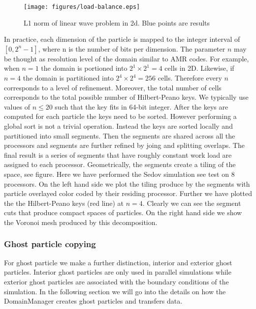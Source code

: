 \begin{figure}
    \begin{center}
        \texttt{[image: figures/load-balance.eps]}
        \caption{L1 norm of linear wave problem in 2d. Blue points are results}
    \end{center}
\end{figure}

In practice, each dimension of the particle is mapped to the integer interval
of $[0, 2^n-1]$, where n is the number of bits per dimension. The parameter
$n$ may be thought as resolution level of the domain similar to AMR codes. For example,
when $n=1$ the domain is portioned into $2^1\times2^1=4$ cells in 2D. Likewise, if $n=4$
the domain is partitioned into $2^4\times2^4=256$ cells. Therefore every $n$ corresponds
to a level of refinement. Moreover, the total number of cells corresponds to the total
possible number of Hilbert-Peano keys. We typically use values of $n\le 20$ such that
the key fits in 64-bit integer. After the keys are computed for each particle the keys
need to be sorted. However performing a global sort is not a trivial operation. Instead
the keys are sorted locally and partitioned into small segments. Then the segments are shared
across all the processors and segments are further refined by joing and splitting overlaps.
The final result is a series of segments that have roughly constant work load are assigned
to each processor. Geometrically, the segments create a tiling of the space, see figure.
Here we have performed the Sedov simulation see test on 8 processors. On the left hand side
we plot the tiling produce by the segments with particle overlayed color coded by their
residing processor. Further we have plotted the the Hilbert-Peano keys (red line) at $n=4$.
Clearly we can see the segment cuts that produce compact spaces of particles. On the right
hand side we show the Voronoi mesh produced by this decomposition.

\subsubsection{Ghost particle copying}
For ghost particle we make a further distinction, interior and exterior ghost particles.
Interior ghost particles are only used in parallel simulations while exterior ghost
particles are associated with the boundary conditions of the simulation. In the following
section we will go into the details on how the DomainManager creates ghost particles
and transfers data.
